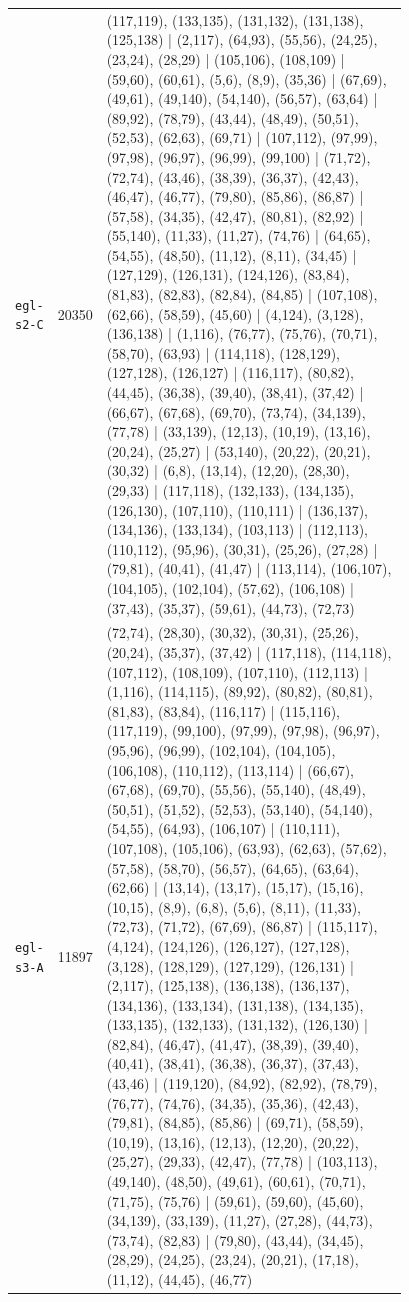 \begin{landscape}
\begin{longtable}{lr>{\tiny\raggedright\arraybackslash}p{0.78\linewidth}}
\texttt{egl-s2-C} & 20350 & (117,119), (133,135), (131,132), (131,138), (125,138) | (2,117), (64,93), (55,56), (24,25), (23,24), (28,29) | (105,106), (108,109) | (59,60), (60,61), (5,6), (8,9), (35,36) | (67,69), (49,61), (49,140), (54,140), (56,57), (63,64) | (89,92), (78,79), (43,44), (48,49), (50,51), (52,53), (62,63), (69,71) | (107,112), (97,99), (97,98), (96,97), (96,99), (99,100) | (71,72), (72,74), (43,46), (38,39), (36,37), (42,43), (46,47), (46,77), (79,80), (85,86), (86,87) | (57,58), (34,35), (42,47), (80,81), (82,92) | (55,140), (11,33), (11,27), (74,76) | (64,65), (54,55), (48,50), (11,12), (8,11), (34,45) | (127,129), (126,131), (124,126), (83,84), (81,83), (82,83), (82,84), (84,85) | (107,108), (62,66), (58,59), (45,60) | (4,124), (3,128), (136,138) | (1,116), (76,77), (75,76), (70,71), (58,70), (63,93) | (114,118), (128,129), (127,128), (126,127) | (116,117), (80,82), (44,45), (36,38), (39,40), (38,41), (37,42) | (66,67), (67,68), (69,70), (73,74), (34,139), (77,78) | (33,139), (12,13), (10,19), (13,16), (20,24), (25,27) | (53,140), (20,22), (20,21), (30,32) | (6,8), (13,14), (12,20), (28,30), (29,33) | (117,118), (132,133), (134,135), (126,130), (107,110), (110,111) | (136,137), (134,136), (133,134), (103,113) | (112,113), (110,112), (95,96), (30,31), (25,26), (27,28) | (79,81), (40,41), (41,47) | (113,114), (106,107), (104,105), (102,104), (57,62), (106,108) | (37,43), (35,37), (59,61), (44,73), (72,73) \\[2pt]
\texttt{egl-s3-A} & 11897 & (72,74), (28,30), (30,32), (30,31), (25,26), (20,24), (35,37), (37,42) | (117,118), (114,118), (107,112), (108,109), (107,110), (112,113) | (1,116), (114,115), (89,92), (80,82), (80,81), (81,83), (83,84), (116,117) | (115,116), (117,119), (99,100), (97,99), (97,98), (96,97), (95,96), (96,99), (102,104), (104,105), (106,108), (110,112), (113,114) | (66,67), (67,68), (69,70), (55,56), (55,140), (48,49), (50,51), (51,52), (52,53), (53,140), (54,140), (54,55), (64,93), (106,107) | (110,111), (107,108), (105,106), (63,93), (62,63), (57,62), (57,58), (58,70), (56,57), (64,65), (63,64), (62,66) | (13,14), (13,17), (15,17), (15,16), (10,15), (8,9), (6,8), (5,6), (8,11), (11,33), (72,73), (71,72), (67,69), (86,87) | (115,117), (4,124), (124,126), (126,127), (127,128), (3,128), (128,129), (127,129), (126,131) | (2,117), (125,138), (136,138), (136,137), (134,136), (133,134), (131,138), (134,135), (133,135), (132,133), (131,132), (126,130) | (82,84), (46,47), (41,47), (38,39), (39,40), (40,41), (38,41), (36,38), (36,37), (37,43), (43,46) | (119,120), (84,92), (82,92), (78,79), (76,77), (74,76), (34,35), (35,36), (42,43), (79,81), (84,85), (85,86) | (69,71), (58,59), (10,19), (13,16), (12,13), (12,20), (20,22), (25,27), (29,33), (42,47), (77,78) | (103,113), (49,140), (48,50), (49,61), (60,61), (70,71), (71,75), (75,76) | (59,61), (59,60), (45,60), (34,139), (33,139), (11,27), (27,28), (44,73), (73,74), (82,83) | (79,80), (43,44), (34,45), (28,29), (24,25), (23,24), (20,21), (17,18), (11,12), (44,45), (46,77) \\[2pt]

\end{longtable}
\end{landscape}
